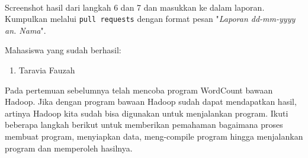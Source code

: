 \documentclass[a4paper]{tufte-handout}
\begin{document}
 \\
Screenshot hasil dari langkah 6 dan 7 dan masukkan ke dalam laporan. Kumpulkan melalui {\tt pull requests} dengan format pesan "\textit{Laporan dd-mm-yyyy an. Nama}".

\noindent
Mahasiswa yang sudah berhasil:
\begin{multicols}{2}
\begin{enumerate}
\item Taravia Fauzah
\end{enumerate}
\end{multicols}

\hrulefill

\clearpage
{}


Pada pertemuan sebelumnya telah mencoba program WordCount bawaan Hadoop. Jika dengan program bawaan Hadoop sudah dapat mendapatkan hasil, artinya Hadoop kita sudah bisa digunakan untuk menjalankan program. Ikuti beberapa langkah berikut untuk memberikan pemahaman bagaimana proses membuat program, menyiapkan data, meng-compile program hingga menjalankan program dan memperoleh hasilnya.
\end{document}

